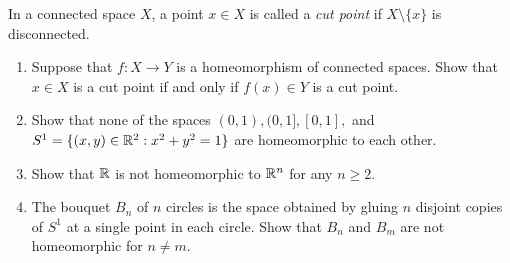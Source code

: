 \documentclass[12pt]{article}
\begin{document}
\begin{problem}{2}
In a connected space $X$, a point $x \in X$ is called a \emph{cut point} if $X \setminus \{ x \}$ is disconnected. 
    \begin{enumerate}
        \item Suppose that $f: X \to Y$ is a homeomorphism of connected spaces. Show that $x \in X$ is a cut point if and only if $f(x) \in Y$ is a cut point. 
        \item Show that none of the spaces $(0,1), (0,1], [0,1],$ and $S^1 = \{ (x,y) \in \mathbb R^2 : x^2 + y^2 =1 \} $ are homeomorphic to each other. 
        \item Show that $\mathbb R$ is not homeomorphic to $\mathbb R^n$ for any $n \geq 2$. 
        \item The bouquet $B_n$ of $n$ circles is the space obtained by gluing $n$ disjoint copies of $S^1$ at a single point in each circle. Show that $B_n$ and $B_m$ are not homeomorphic for $n \neq m$. 
    \end{enumerate}
\end{problem}
\end{document}
